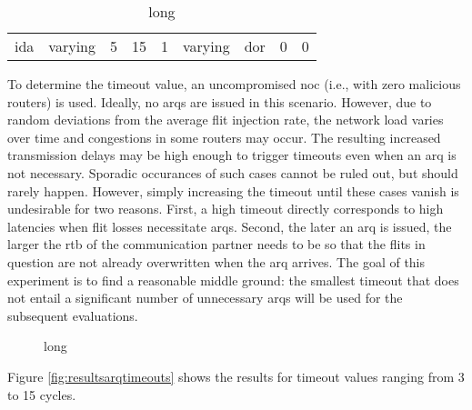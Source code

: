 \begin{table}
    \centering
    \begin{tabulary}{\textwidth}{C|C|C|C|C|C|C|C|C}
        \pProtVar{} & \pNCMode{} & \pEncMods{} & \pAuthMods{} & \pARQLimit{} & \pARQTimeout{} & \pRStrat{} & \pNumAttackers{} & \pAttackProb{} \\\hline
        \gls{ida} & varying & 5 & 15 & 1 & varying & \gls{dor} & 0 & 0 \\
    \end{tabulary}
    \caption[Input parameters for ARQ timeouts experiment]{long}
    \label{tab:setuparqtimeouts}
\end{table}

To determine the timeout value, an uncompromised \gls{noc} (i.e., with zero malicious routers) is used. Ideally, no \glspl{arq} are issued in this
scenario. However, due to random deviations from the average flit injection rate, the network load varies over time and congestions in some routers
may occur. The resulting increased transmission delays may be high enough to trigger timeouts even when an \gls{arq} is not necessary. Sporadic
occurances of such cases cannot be ruled out, but should rarely happen. However, simply increasing the timeout until these cases vanish is undesirable
for two reasons. First, a high timeout directly corresponds to high latencies when flit losses necessitate \glspl{arq}. Second, the later an \gls{arq}
is issued, the larger the \gls{rtb} of the communication partner needs to be so that the flits in question are not already overwritten when the
\gls{arq} arrives. The goal of this experiment is to find a reasonable middle ground: the smallest timeout that does not entail a significant number of
unnecessary \glspl{arq} will be used for the subsequent evaluations.

\begin{figure}
    \centering
    
    \caption[Results for ARQ timeouts experiment]{long}
    \label{fig:resultsarqtimeouts}
\end{figure}

Figure \vref{fig:resultsarqtimeouts} shows the results for timeout values ranging from 3 to 15 cycles.

